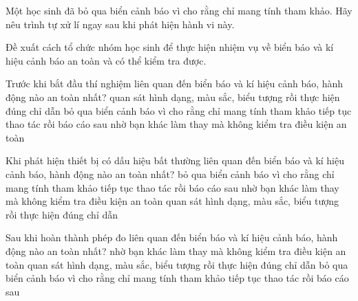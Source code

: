 \begin{bt}
Một học sinh đã bỏ qua biển cảnh báo vì cho rằng chỉ mang tính tham khảo. Hãy nêu trình tự xử lí ngay sau khi phát hiện hành vi này.
\end{bt}

\begin{bt}
Đề xuất cách tổ chức nhóm học sinh để thực hiện nhiệm vụ về biển báo và kí hiệu cảnh báo an toàn và có thể kiểm tra được.
\end{bt}

\begin{ex}
Trước khi bắt đầu thí nghiệm liên quan đến biển báo và kí hiệu cảnh báo, hành động nào an toàn nhất?
\choice
{\True quan sát hình dạng, màu sắc, biểu tượng rồi thực hiện đúng chỉ dẫn}
{bỏ qua biển cảnh báo vì cho rằng chỉ mang tính tham khảo}
{tiếp tục thao tác rồi báo cáo sau}
{nhờ bạn khác làm thay mà không kiểm tra điều kiện an toàn}
\end{ex}

\begin{ex}
Khi phát hiện thiết bị có dấu hiệu bất thường liên quan đến biển báo và kí hiệu cảnh báo, hành động nào an toàn nhất?
\choice
{bỏ qua biển cảnh báo vì cho rằng chỉ mang tính tham khảo}
{tiếp tục thao tác rồi báo cáo sau}
{nhờ bạn khác làm thay mà không kiểm tra điều kiện an toàn}
{\True quan sát hình dạng, màu sắc, biểu tượng rồi thực hiện đúng chỉ dẫn}
\end{ex}

\begin{ex}
Sau khi hoàn thành phép đo liên quan đến biển báo và kí hiệu cảnh báo, hành động nào an toàn nhất?
\choice
{nhờ bạn khác làm thay mà không kiểm tra điều kiện an toàn}
{\True quan sát hình dạng, màu sắc, biểu tượng rồi thực hiện đúng chỉ dẫn}
{bỏ qua biển cảnh báo vì cho rằng chỉ mang tính tham khảo}
{tiếp tục thao tác rồi báo cáo sau}
\end{ex}

